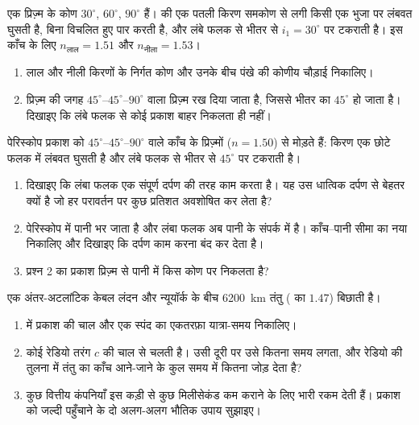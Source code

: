 \begin{exercise}[$\star\star\star$]\label{exo:g10:refraction:13}
एक प्रिज़्म के कोण $30^\circ$, $60^\circ$, $90^\circ$ हैं।
 की एक पतली किरण समकोण से लगी किसी एक भुजा पर लंबवत
घुसती है, बिना विचलित हुए पार करती है, और लंबे फलक से भीतर से $i_1 = 30^\circ$
पर टकराती है। इस काँच के लिए $n_{\text{लाल}} = 1.51$ और $n_{\text{नीला}} = 1.53$।
\begin{enumerate}
  \item लाल और नीली किरणों के निर्गत कोण और उनके बीच पंखे की कोणीय
        चौड़ाई निकालिए।
  \item प्रिज़्म की जगह $45^\circ$--$45^\circ$--$90^\circ$ वाला प्रिज़्म रख दिया
        जाता है, जिससे भीतर का  $45^\circ$ हो जाता है।
        दिखाइए कि लंबे फलक से कोई प्रकाश बाहर निकलता ही नहीं।
\end{enumerate}
\end{exercise}

\begin{exercise}[$\star\star\star$]\label{exo:g10:refraction:14}
पेरिस्कोप प्रकाश को $45^\circ$--$45^\circ$--$90^\circ$ वाले काँच के प्रिज़्मों
($n = 1.50$) से मोड़ते हैं: किरण एक छोटे फलक में लंबवत घुसती है और लंबे
फलक से भीतर से $45^\circ$ पर टकराती है।
\begin{enumerate}
  \item दिखाइए कि लंबा फलक एक संपूर्ण दर्पण की तरह काम करता है। यह उस
        धात्विक दर्पण से बेहतर क्यों है जो हर परावर्तन पर कुछ प्रतिशत
        अवशोषित कर लेता है?
  \item पेरिस्कोप में पानी भर जाता है और लंबा फलक अब पानी के संपर्क में
        है। काँच--पानी सीमा का नया  निकालिए और
        दिखाइए कि दर्पण काम करना बंद कर देता है।
  \item प्रश्न 2 का प्रकाश प्रिज़्म से पानी में किस कोण पर निकलता है?
\end{enumerate}
\end{exercise}

\begin{exercise}[$\star\star\star$]\label{exo:g10:refraction:15}
एक अंतर-अटलांटिक केबल लंदन और न्यूयॉर्क के बीच \qty{6200}{km} तंतु
( का  $1.47$) बिछाती है।
\begin{enumerate}
  \item {} में प्रकाश की चाल और एक स्पंद का एकतरफ़ा
        यात्रा-समय निकालिए।
  \item कोई रेडियो तरंग $c$ की चाल से चलती है। उसी दूरी पर उसे
        कितना समय लगता, और रेडियो की तुलना में तंतु का काँच आने-जाने के
        कुल समय में कितना जोड़ देता है?
  \item कुछ वित्तीय कंपनियाँ इस कड़ी से कुछ मिलीसेकंड कम कराने के लिए
        भारी रकम देती हैं। प्रकाश को जल्दी पहुँचाने के दो अलग-अलग
        भौतिक उपाय सुझाइए।
\end{enumerate}
\end{exercise}

